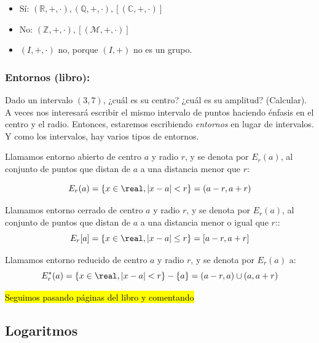 \documentclass[palatino,nosec]{Docencia}
\begin{document}

\begin{example}
	\begin{itemize}
		\item Sí: $(ℝ,+,·),(ℚ,+,·),\left[(ℂ,+,·)\right]$
		\item No: $(ℤ,+,·),\left[(\mathcal{M},+,·)\right]$
		\item $\left(I,+,·\right)$ no, porque $(I,+)$ no es un grupo.
	\end{itemize}
\end{example}


\subsubsection{Entornos (libro):} Dado un intervalo $(3,7)$, ¿cuál es su centro? ¿cuál es su amplitud? (Calcular). A veces nos interesará escribir el mismo intervalo de puntos haciendo énfasis en el centro y el radio. 
%
Entonces, estaremos escribiendo \textit{entornos} en lugar de intervalos. 
%
Y como los intervalos, hay varios tipos de entornos.

\begin{defn}
Llamamos entorno abierto de centro $a$ y radio $r$, y se denota por $E_r(a)$, al conjunto de puntos que distan de $a$ a una distancia menor que $r$:

\[
	E_r(a) = \{x\in\real, |x-a| < r\} = (a-r, a+r) 
\]
\end{defn}

\begin{defn}
Llamamos entorno cerrado de centro $a$ y radio $r$, y se denota por $E_r(a)$, al conjunto de puntos que distan de $a$ a una distancia menor o igual que $r$::
\[
	E_r[a]  = \{x\in\real, |x-a| \leq r\} = [a-r, a+r]
\]
\end{defn}

\begin{defn}
Llamamos entorno reducido de centro $a$ y radio $r$, y se denota por $E_r(a)$ a:
\[
	E^{\ast}_r(a) = \{x\in\real, |x-a| < r\} - \{a\} = (a-r,a) \cup (a, a+r)
\]
\end{defn}


\hl{Seguimos pasando páginas del libro y comentando}

\subsection{Logaritmos}
\end{document}
